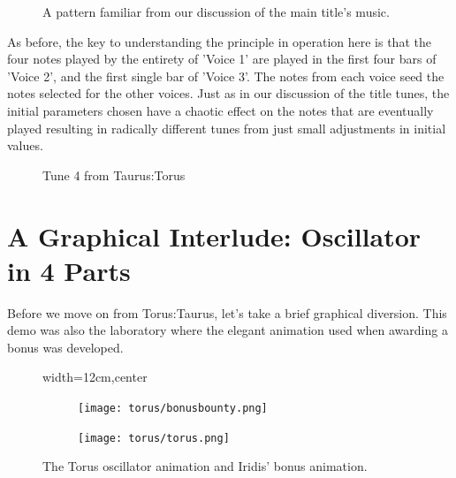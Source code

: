 \begin{figure}[H]
{
  \begin{adjustbox}{width=14cm,center}
    \texttt{[image: torus/title\_no\_1\_page\_1001.png]}}%
  \end{adjustbox}
}\caption[]{A pattern familiar from our discussion of the main title's music.}
\end{figure}

As before, the key to understanding the principle in operation here is that the four notes played by the entirety of 'Voice 1' are played in the first
four bars of 'Voice 2', and the first single bar of 'Voice 3'. The notes from each voice seed the notes selected for the other voices. Just as in our
discussion of the title tunes, the initial parameters chosen have a chaotic effect on the notes that are eventually played resulting in radically different
tunes from just small adjustments in initial values.

\begin{figure}[H]
{
  \begin{adjustbox}{width=14cm,center}
    \texttt{[image: torus/title\_no\_4\_page\_1001.png]}}%
  \end{adjustbox}
}\caption[]{Tune 4 from Taurus:Torus}
\end{figure}


\clearpage
\section{A Graphical Interlude: Oscillator in 4 Parts}
Before we move on from Torus:Taurus, let's take a brief graphical diversion.
This demo was also  the laboratory where the elegant animation used when awarding a bonus was developed. 
\begin{figure}[H]
{
  \setlength{\tabcolsep}{3.0pt}
  \setlength\cmidrulewidth{\heavyrulewidth} %
    \begin{adjustbox}{width=12cm,center}
  \begin{subfigure}{0.3\textwidth}
  \texttt{[image: torus/bonusbounty.png]}%
  \end{subfigure}
  \begin{subfigure}{0.3\textwidth}
  \texttt{[image: torus/torus.png]}%
  \end{subfigure}
  \end{adjustbox}
}\caption[]{The Torus oscillator animation and Iridis' bonus animation.}
\end{figure}

